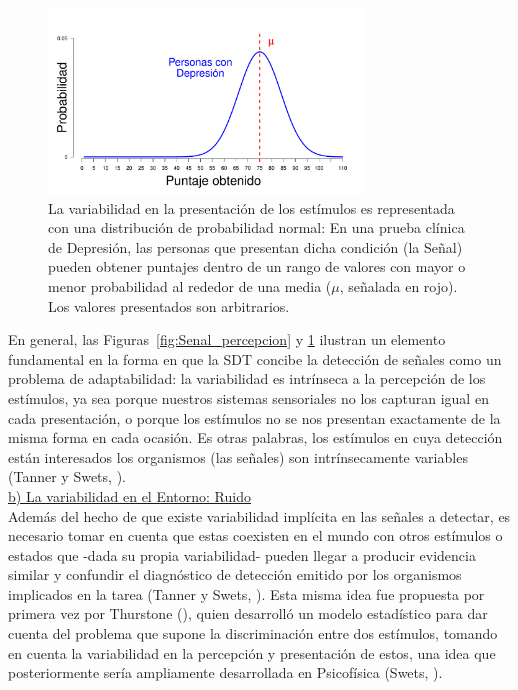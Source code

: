 \begin{figure}[h]
\centering
\includegraphics[width=0.75\textwidth]{Figures/Signal_Presentation} 
\decoRule
\caption[Variabilidad en la presentación de los estímulos]{La variabilidad en la presentación de los estímulos es representada con una distribución de probabilidad normal: En una prueba clínica de Depresión, las personas que presentan dicha condición (la Señal) pueden obtener puntajes dentro de un rango de valores con mayor o menor probabilidad al rededor de una media ($\mu$, señalada en rojo). Los valores presentados son arbitrarios.}
\label{fig:Senal_presentacion}
\end{figure}

En general, las Figuras~\ref{fig:Senal_percepcion} y \ref{fig:Senal_presentacion} ilustran un elemento fundamental en la forma en que la SDT concibe la detección de señales como un problema de adaptabilidad: la variabilidad es intrínseca a la percepción de los estímulos, ya sea porque nuestros sistemas sensoriales no los capturan igual en cada presentación, o porque los estímulos no se nos presentan exactamente de la misma forma en cada ocasión. Es otras palabras, los estímulos en cuya detección están interesados los organismos (las señales) son intrínsecamente variables (Tanner y Swets, \citeyear{Tanner1954}).\\

    \underline{b) La variabilidad en el Entorno: Ruido}\\

Además del hecho de que existe variabilidad implícita en las señales a detectar, es necesario tomar en cuenta que estas coexisten en el mundo con otros estímulos o estados que -dada su propia variabilidad- pueden llegar a producir evidencia similar y confundir el diagnóstico de detección emitido por los organismos implicados en la tarea (Tanner y Swets, \citeyear{Tanner1954}). Esta misma idea fue propuesta por primera vez por Thurstone (\citeyear{Thurstone1927}), quien desarrolló un modelo estadístico para dar cuenta del problema que supone la discriminación entre dos estímulos, tomando en cuenta la variabilidad en la percepción y presentación de estos, una idea que posteriormente sería ampliamente desarrollada en Psicofísica (Swets, \citeyear{Swets1973}).\\

